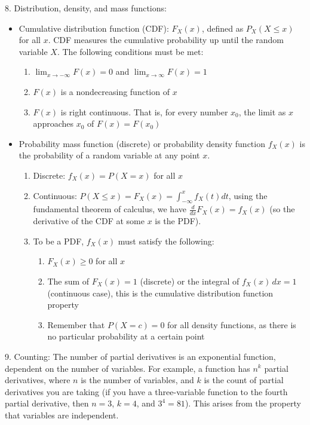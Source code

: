 \documentclass{article}
\begin{document}
8. Distribution, density, and mass functions:
   \begin{itemize}
       \item Cumulative distribution function (CDF): \(F_X(x)\), defined as \(P_X(X \leq x)\) for all \(x\). CDF measures the cumulative probability up until the random variable \(X\). The following conditions must be met:
           \begin{enumerate}
               \item \(\lim_{x \to -\infty} F(x) = 0\) and \(\lim_{x \to \infty} F(x) = 1\)
               \item \(F(x)\) is a nondecreasing function of \(x\) 
               \item \(F(x)\) is right continuous. That is, for every number \(x_0\), the limit as \(x\) approaches \(x_0\) of \(F(x) = F(x_0)\)
           \end{enumerate}
       \item Probability mass function (discrete) or probability density function \(f_X(x)\) is the probability of a random variable at any point \(x\).
           \begin{enumerate}
               \item Discrete: \(f_X(x) = P(X = x)\) for all \(x\)
               \item Continuous: \(P(X \leq x) = F_X(x) = \int_{-\infty}^{x} f_X(t) dt\), using the fundamental theorem of calculus, we have \(\frac{d}{dx}F_X(x) = f_X(x)\) (so the derivative of the CDF at some \(x\) is the PDF).
               \item To be a PDF, \(f_X(x)\) must satisfy the following: 
                   \begin{enumerate}
                       \item \(F_X(x) \geq 0\) for all \(x\)
                       \item The sum of \(F_X(x) = 1\) (discrete) or the integral of \(f_X(x) \, dx = 1\) (continuous case), this is the cumulative distribution function property
                       \item Remember that $P(X=c) = 0$ for all density functions, as there is no particular probability at a certain point
                   \end{enumerate}
           \end{enumerate}
   \end{itemize}

9. Counting: The number of partial derivatives is an exponential function, dependent on the number of variables. For example, a function has \(n^k\) partial derivatives, where \(n\) is the number of variables, and \(k\) is the count of partial derivatives you are taking (if you have a three-variable function to the fourth partial derivative, then \(n = 3\), \(k = 4\), and \(3^4 = 81\)). This arises from the property that variables are independent.
\end{document}
